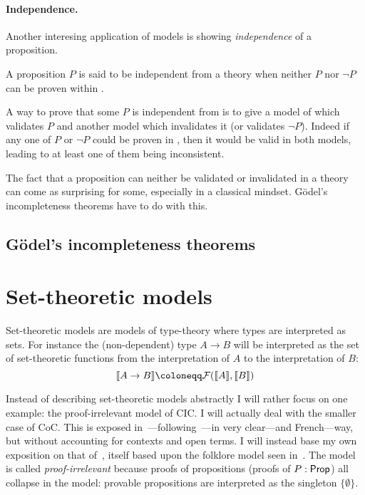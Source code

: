 \paragraph{Independence.}

Another interesing application of models is showing \emph{independence} of a
proposition.

\begin{definition}
  A proposition \(P\) is said to be independent from a theory \cT when neither
  \(P\) nor \(\neg P\) can be proven within \cT.
\end{definition}

A way to prove that some \(P\) is independent from \cT is to give a model of \cT
which validates \(P\) and another model which invalidates it (or validates
\(\neg P\)). Indeed if any one of \(P\) or \(\neg P\) %
could be proven in \cT, then it would be valid in both models, leading to
at least one of them being inconsistent.

The fact that a proposition can neither be validated or invalidated in a theory
can come as surprising for some, especially in a classical mindset.
Gödel's incompleteness theorems have to do with this.

\subsection{Gödel's incompleteness theorems}


\section{Set-theoretic models}

Set-theoretic models are models of type-theory where types are interpreted as
sets. For instance the (non-dependent) type \(A \to B\) will be interpreted as
the set of set-theoretic functions from the interpretation of \(A\) to the
interpretation of \(B\):
\[
  \transl{A \to B} \coloneqq \setfun{\transl{A}}{\transl{B}}
\]

Instead of describing set-theoretic models abstractly I will rather focus on one
example: the proof-irrelevant model of \acrshort{CIC}. I will actually deal with
the smaller case of \acrshort{CoC}.
This is exposed
in~---following~---in very clear---and French---way,
but without accounting for contexts and open terms.
I will instead base my own exposition on that of~,
itself based upon the folklore model seen
in~.
The model is called \emph{proof-irrelevant} because proofs of propositions
(proofs of \(P : \mathsf{Prop}\)) all collapse in the model: provable propositions
are interpreted as the singleton \(\{ \emptyset \}\).

